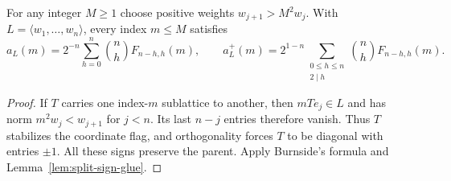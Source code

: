 \begin{corollary}\label{cor:even-separated-window}
For any integer $M\ge1$ choose positive weights $w_{j+1}>M^2w_j$. With $L=\langle w_1,\ldots,w_n\rangle$, every index $m\le M$ satisfies
\[
 a_L(m)=2^{-n}\sum_{h=0}^n\binom nh F_{n-h,h}(m),\qquad
 a_L^+(m)=2^{1-n}\sum_{\substack{0\le h\le n\\2\mid h}}\binom nh F_{n-h,h}(m).
\]
\end{corollary}
\begin{proof}
If $T$ carries one index-$m$ sublattice to another, then $mTe_j\in L$ and has norm $m^2w_j<w_{j+1}$ for $j<n$. Its last $n-j$ entries therefore vanish. Thus $T$ stabilizes the coordinate flag, and orthogonality forces $T$ to be diagonal with entries $\pm1$. All these signs preserve the parent. Apply Burnside's formula and Lemma~\ref{lem:split-sign-glue}.
\end{proof}

